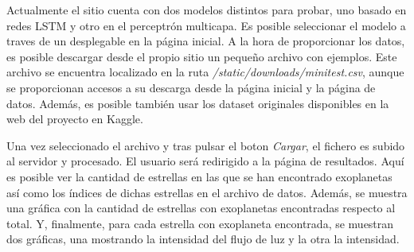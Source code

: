 
Actualmente el sitio cuenta con dos modelos distintos para probar, uno basado en redes LSTM y otro en el perceptrón multicapa. Es posible seleccionar el modelo a traves de un desplegable en la página inicial. A la hora de proporcionar los datos, es posible descargar desde el propio sitio un pequeño archivo con ejemplos. Este archivo se encuentra localizado en la ruta \textit{/static/downloads/minitest.csv}, aunque se proporcionan accesos a su descarga desde la página inicial y la página de datos. Además, es posible también usar los dataset originales disponibles en la web del proyecto\cite{Kaggle-exoplanet} en Kaggle.


Una vez seleccionado el archivo y tras pulsar el boton \textit{Cargar}, el fichero es subido al servidor y procesado. El usuario será redirigido a la página de resultados. Aquí es posible ver la cantidad de estrellas en las que se han encontrado exoplanetas así como los índices de dichas estrellas en el archivo de datos. Además, se muestra una gráfica con la cantidad de estrellas con exoplanetas encontradas respecto al total. Y, finalmente, para cada estrella con exoplaneta encontrada, se muestran dos gráficas, una mostrando la intensidad del flujo de luz y la otra la intensidad.


